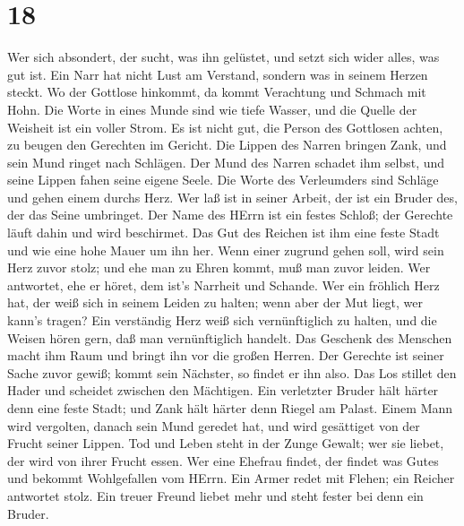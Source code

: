 \hypertarget{section-17}{%
\section{18}\label{section-17}}

 Wer sich absondert, der sucht, was ihn gelüstet, und setzt
sich wider alles, was gut ist.  Ein Narr hat nicht Lust am
Verstand, sondern was in seinem Herzen steckt.  Wo der
Gottlose hinkommt, da kommt Verachtung und Schmach mit Hohn.
 Die Worte in eines Munde sind wie tiefe Wasser, und die
Quelle der Weisheit ist ein voller Strom.  Es ist nicht gut,
die Person des Gottlosen achten, zu beugen den Gerechten im Gericht.
 Die Lippen des Narren bringen Zank, und sein Mund ringet
nach Schlägen.  Der Mund des Narren schadet ihm selbst, und
seine Lippen fahen seine eigene Seele.  Die Worte des
Verleumders sind Schläge und gehen einem durchs Herz.  Wer
laß ist in seiner Arbeit, der ist ein Bruder des, der das Seine
umbringet.  Der Name des HErrn ist ein festes Schloß; der
Gerechte läuft dahin und wird beschirmet.  Das Gut des
Reichen ist ihm eine feste Stadt und wie eine hohe Mauer um ihn her.
 Wenn einer zugrund gehen soll, wird sein Herz zuvor stolz;
und ehe man zu Ehren kommt, muß man zuvor leiden.  Wer
antwortet, ehe er höret, dem ist's Narrheit und Schande. 
Wer ein fröhlich Herz hat, der weiß sich in seinem Leiden zu halten;
wenn aber der Mut liegt, wer kann's tragen?  Ein verständig
Herz weiß sich vernünftiglich zu halten, und die Weisen hören gern, daß
man vernünftiglich handelt.  Das Geschenk des Menschen
macht ihm Raum und bringt ihn vor die großen Herren.  Der
Gerechte ist seiner Sache zuvor gewiß; kommt sein Nächster, so findet er
ihn also.  Das Los stillet den Hader und scheidet zwischen
den Mächtigen.  Ein verletzter Bruder hält härter denn eine
feste Stadt; und Zank hält härter denn Riegel am Palast. 
Einem Mann wird vergolten, danach sein Mund geredet hat, und wird
gesättiget von der Frucht seiner Lippen.  Tod und Leben
steht in der Zunge Gewalt; wer sie liebet, der wird von ihrer Frucht
essen.  Wer eine Ehefrau findet, der findet was Gutes und
bekommt Wohlgefallen vom HErrn.  Ein Armer redet mit
Flehen; ein Reicher antwortet stolz.  Ein treuer Freund
liebet mehr und steht fester bei denn ein Bruder.

